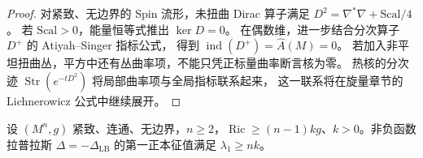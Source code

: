 \begin{proof}
对紧致、无边界的 Spin 流形，未扭曲 Dirac 算子满足
$D^2=\nabla^*\nabla+\mathrm{Scal}/4$。
若 $\mathrm{Scal}>0$，能量恒等式推出 $\ker D=0$。
在偶数维，进一步结合分次算子 $D^+$ 的 Atiyah--Singer 指标公式，
得到 $\operatorname{ind}(D^+)=\hat A(M)=0$。
若加入非平坦扭曲丛，平方中还有丛曲率项，不能只凭正标量曲率断言核为零。
热核的分次迹 $\operatorname{Str}(e^{-tD^2})$ 将局部曲率项与全局指标联系起来，
这一联系将在旋量章节的 Lichnerowicz 公式中继续展开。
\end{proof}

\begin{theorem}
设 $(M^n,g)$ 紧致、连通、无边界，$n\ge2$，$\operatorname{Ric}\ge(n-1)kg$、$k>0$。非负函数拉普拉斯 $\Delta=-\Delta_{\mathrm{LB}}$ 的第一正本征值满足 $\lambda_1\ge nk$。
\end{theorem}

